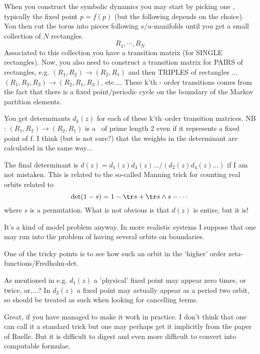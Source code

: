 \begin{description}
When you construct the symbolic dynamics you may start by picking one
\po, typically the fixed point  $p=f(p)$  (but the following
depends on the choice).  You then cut the torus into pieces following
$s/u$-manifolds until you get a small collection of $N$ rectangles.
\[
R_1,\cdots,R_N
\]
Associated to this collection you have a transition matrix (for SINGLE
rectangles).  Now, you also need to construct a transition matrix for
PAIRS of rectangles, e.g.  $(R_1,R_2)  \to  (R_2,R_1)$ and then TRIPLES of
rectangles ... $(R_1,R_2,R_3) \to (R_2,R_1,R_3)$, etc....
These k'th - order transitions comes from the fact that there is a fixed
point/periodic cycle on the boundary of the Markov partition elements.

You get determinants   $d_k(z)$ for each of these k'th–order transition matrices.
 NB :
$(R_1,R_2) \to (R_2,R_1)$  is a \po\ of prime length 2 even if
it represents a fixed point of f. I think (but is not sure?) that the
weights in the determinant are calculated in the same way...

The final determinant is
\(
d(z)=d_1(z)d_3(z)... / (d_2(z) d_4(z)...)
\)
if I am not mistaken. This is related to the so-called Manning trick for
counting real orbits related to
\[
\det (1 - s) = 1 - \tr s + \tr s \wedge s
- \cdots
\]
where $s$ is a permutation.
What is not obvious is that $d(z)$  is entire, but it is!

It's a kind of model problem anyway. In more realistic systems I suppose
that one may run into the problem of having several orbits on boundaries.

One of the tricky points is to see how such an orbit in the `higher'
order zeta-functions/Fredholm-det.

As mentioned in e.g. $d_1(z)$ a 'physical' fixed point may appear
zero times, or twice, or,...? In $d_2(z)$ a fixed point may actually appear
as a period two orbit, so should be treated as such when looking for
cancelling terms.

Great, if you have managed to make it work in practice.
I don't think that one can call it a standard trick but one may perhaps
get it implicitly from the paper of Ruelle. But it is
difficult to digest and even more difficult to convert into computable
formulae.

\end{description}
